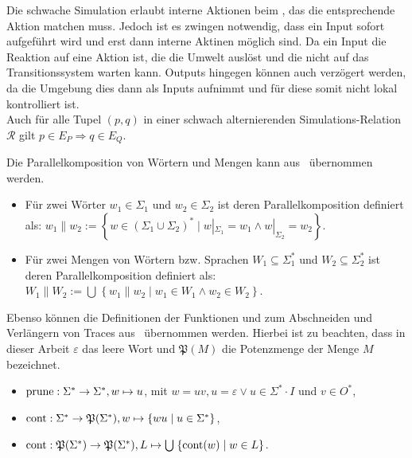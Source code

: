Die schwache Simulation erlaubt interne Aktionen beim \MEIO{}, das die
entsprechende Aktion matchen muss. Jedoch ist es zwingen notwendig, dass ein
Input sofort aufgeführt wird und erst dann interne Aktinen möglich sind. Da
ein Input die Reaktion auf eine Aktion ist, die die Umwelt auslöst und die
nicht auf das Transitionssystem warten kann. Outputs hingegen können auch
verzögert werden, da die Umgebung dies dann als Inputs aufnimmt und für diese
somit nicht lokal kontrolliert ist.\\
Auch für alle Tupel $(p,q)$ in einer schwach alternierenden
Simulations-Relation $\mathcal{R}$ gilt $p\in E_P\Rightarrow q\in E_Q$.

Die Parallelkomposition von Wörtern und Mengen kann aus~\cite{Schinko2016BA}
übernommen werden.

\begin{Def}\mbox{}
  \begin{itemize}
    \item Für zwei Wörter $w_1\in\Sigma _1$ und $w_2\in\Sigma _2$ ist
      deren Parallelkomposition definiert als: $w_1\| w_2:=\left\{w\in
      (\Sigma _1\cup\Sigma _2)^*\mid w|_{\Sigma _1}=w_1\wedge w|_{\Sigma
    _2}=w_2\right\}$.
    \item Für zwei Mengen von Wörtern bzw. Sprachen $W_1\subseteq \Sigma
      ^*_1$ und $W_2\subseteq \Sigma ^*_2$ ist deren Parallelkomposition
      definiert als: $W_1\| W_2:=\bigcup\hspace{1pt}\left\{w_1\| w_2\mid
      w_1\in W_1\wedge w_2\in W_2\right\}$.
  \end{itemize}
\end{Def}

Ebenso können die Definitionen der Funktionen \prune{} und \cont{} zum
Abschneiden und Verlängern von Traces aus~\cite{Schinko2016BA} übernommen
werden. Hierbei ist zu beachten, dass in dieser Arbeit $\varepsilon$ das leere
Wort und $\mathfrak{P}(M)$ die Potenzmenge der Menge $M$ bezeichnet.

\begin{Def}\mbox{}
  \begin{itemize}
    \item $\mathrm{prune}{}:\Sigma ^*\rightarrow\Sigma ^*, w\mapsto u$, mit $w=uv,
      u=\varepsilon\vee u\in\Sigma ^*\cdot I$ und $v\in O^*$,
    \item $\mathrm{cont}{}:\Sigma ^*\rightarrow\mathfrak{P}(\Sigma ^*),
      w\mapsto\left\{wu\mid u\in\Sigma ^*\right\}$,
    \item $\mathrm{cont}{}:\mathfrak{P}(\Sigma ^*)\rightarrow\mathfrak{P}(\Sigma ^*),
      L\mapsto\bigcup\hspace{1pt}\left\{\mathrm{cont}{}(w)\mid w\in L\right\}$.
  \end{itemize}
\end{Def}

